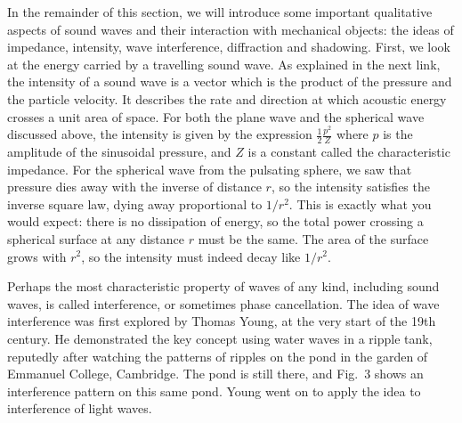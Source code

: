   In the remainder of this section, we will introduce some important 
  qualitative aspects of sound waves and their interaction with mechanical 
  objects: the ideas of impedance, intensity, wave interference, diffraction 
  and shadowing. First, we look at the energy carried by a travelling sound 
  wave. As explained in the next link, the intensity of a sound wave is a 
  vector which is the product of the pressure and the particle velocity. It 
  describes the rate and direction at which acoustic energy crosses a unit area 
  of space. For both the plane wave and the spherical wave discussed above, the 
  intensity is given by the expression $\frac{1}{2} \frac{p^2}{Z}$ where $p$ is 
  the amplitude of the sinusoidal pressure, and $Z$ is a constant called the 
  characteristic impedance. For the spherical wave from the pulsating sphere, 
  we saw that pressure dies away with the inverse of distance $r$, so the 
  intensity satisfies the inverse square law, dying away proportional to 
  $1/r^2$. This is exactly what you would expect: there is no dissipation of 
  energy, so the total power crossing a spherical surface at any distance $r$ 
  must be the same. The area of the surface grows with $r^2$, so the intensity 
  must indeed decay like $1/r^2$. 

  Perhaps the most characteristic property of waves of any kind, including 
  sound waves, is called interference, or sometimes phase cancellation. The 
  idea of wave interference was first explored by Thomas Young, at the very 
  start of the 19th century. He demonstrated the key concept using water waves 
  in a ripple tank, reputedly after watching the patterns of ripples on the 
  pond in the garden of Emmanuel College, Cambridge. The pond is still there, 
  and Fig.\ 3 shows an interference pattern on this same pond. Young went on to 
  apply the idea to interference of light waves. 


